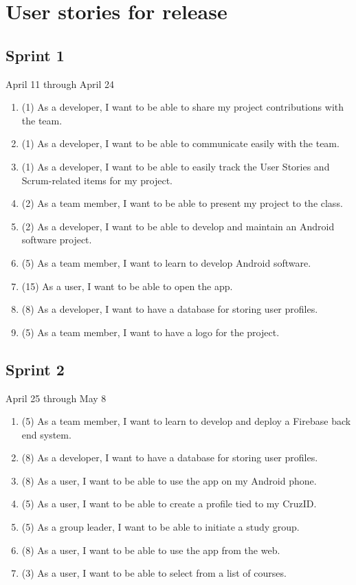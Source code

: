 \documentclass[10pt]{article}
\begin{document}
    \section{User stories for release}

    \subsection{Sprint 1}
    April 11 through April 24
    \begin{enumerate}
        \item (1) As a developer, I want to be able to share my project contributions with the team.
        \item (1) As a developer, I want to be able to communicate easily with the team.
        \item (1) As a developer, I want to be able to easily track the User Stories and Scrum-related items for my project.
        \item (2) As a team member, I want to be able to present my project to the class.
        \item (2) As a developer, I want to be able to develop and maintain an Android software project.
        \item (5) As a team member, I want to learn to develop Android software.
        \item (15) As a user, I want to be able to open the app.
        \item (8) As a developer, I want to have a database for storing user profiles.
        \item (5) As a team member, I want to have a logo for the project.
    \end{enumerate}

    \subsection{Sprint 2}
    April 25 through May 8
    \begin{enumerate}
        \item (5) As a team member, I want to learn to develop and deploy a Firebase back end system.
        \item (8) As a developer, I want to have a database for storing user profiles.
        \item (8) As a user, I want to be able to use the app on my Android phone.
        \item (5) As a user, I want to be able to create a profile tied to my CruzID.
        \item (5) As a group leader, I want to be able to initiate a study group.
        \item (8) As a user, I want to be able to use the app from the web.
        \item (3) As a user, I want to be able to select from a list of courses.
    \end{enumerate}
    
\end{document}
